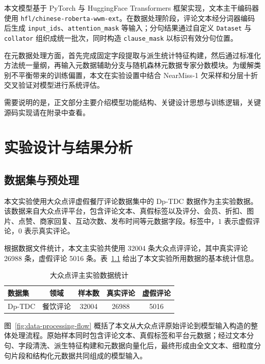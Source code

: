 \documentclass[UTF8,oneside,openright,fontset=none]{ctexbook}
\numberwithin{equation}{chapter}
\begin{document}
本文模型基于 PyTorch 与 HuggingFace Transformers 框架实现，文本主干编码器使用 \texttt{hfl/\allowbreak chinese-\allowbreak roberta-\allowbreak wwm-\allowbreak ext}。在数据处理阶段，评论文本经分词器编码后生成 \texttt{input\_ids}、\texttt{attention\_mask} 等输入；分句结果通过自定义 \texttt{Dataset} 与 \texttt{collator} 组织成统一批次，同时构造 \texttt{clause\_mask} 以标识有效分句位置。

在元数据处理方面，首先完成固定字段提取与派生统计特征构建，然后通过标准化方法统一量纲，再输入元数据辅助分支与随机森林元数据专家分数模块。为缓解类别不平衡带来的训练偏置，本文在实验设置中结合 NearMiss-1 欠采样和分层十折交叉验证对模型进行系统评估。

需要说明的是，正文部分主要介绍模型功能结构、关键设计思想与训练逻辑，关键源码实现请在附录中查看。
\chapter{实验设计与结果分析}

\section{数据集与预处理}
本文实验使用大众点评虚假餐厅评论数据集中的 Dp-TDC 数据作为主实验数据。该数据来自大众点评平台，包含评论文本、真假标签以及评分、会员、折扣、图片、点赞、商家回复、互动次数、发布时间等元数据字段。标签中，$1$ 表示虚假评论，$0$ 表示真实评论。

根据数据文件统计，本文主实验共使用 32004 条大众点评评论，其中真实评论 26988 条，虚假评论 5016 条。表~\ref{tab:dataset} 给出了本文实验所用数据的基本统计信息。

\begin{table}[htbp]
  \centering
  \caption{大众点评主实验数据统计}
  \label{tab:dataset}
  \begin{tabular}{lcccc}
    \toprule
    数据集 & 领域 & 样本数 & 真实评论 & 虚假评论 \\
    \midrule
    Dp-TDC & 餐饮评论 & 32004 & 26988 & 5016 \\
    \bottomrule
  \end{tabular}
\end{table}

图~\ref{fig:data-processing-flow} 概括了本文从大众点评原始评论到模型输入构造的整体处理流程。原始样本同时包含评论文本、真假标签和平台元数据；经过文本分句、字段清洗、派生特征构建和元数据向量化后，最终形成由全文文本、细粒度分句片段和结构化元数据共同组成的模型输入。
\end{document}
